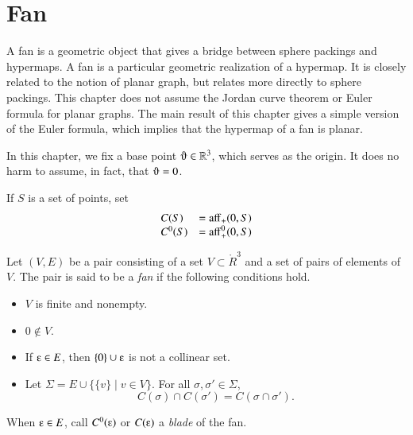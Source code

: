 
\chapter{Fan}\label{sec:fan}

A fan is a geometric object that gives a bridge between sphere packings and hypermaps.  A fan is a particular geometric realization of a hypermap.  It is closely related to the notion of planar graph, but relates more directly to sphere packings.  This chapter does not  assume the Jordan curve theorem or Euler formula for planar graphs.  The main result of this chapter gives a simple version of the Euler formula, 
which implies that the hypermap of a fan is planar.

In this chapter, we fix a base point $\orgn\in\ring{R}^3$, which serves as the origin.  It does no harm to assume, in fact, that $\orgn =0$.

If $S$ is a set of points,
set
  $$
  \begin{array}{lll}
  C(S) &= {\operatorname{aff}}_+(0,S)\\
  C^0(S) &= {\operatorname{aff}}^0_+(0,S)\\
  \end{array}
  $$

\begin{definition}[fan]  
Let $(V,E)$ be a pair consisting of a set $V\subset \ring{R}^3$ and a set of pairs of elements of $V$.  The pair is said to be
a {\it fan\/} if the following conditions hold.
    \begin{itemize}
    \item $V$ is finite and nonempty.
    \item $0\not\in V$.
    \item If $\e \in E$, then $\{0\}\cup \e$ is not a collinear set.
    \item Let $\Sigma = E \cup \{\{v\}\mid v\in V\}$.
    For all $\sigma,\sigma'\in \Sigma$, 
 $$C(\sigma)\cap C(\sigma') = C(\sigma\cap \sigma').$$
    \end{itemize}
When $\e\in E$, call $C^0(\e)$ or $C(\e)$ a {\it blade\/} of the fan.
\end{definition}

\bigskip\hbox{~}\bigskip


